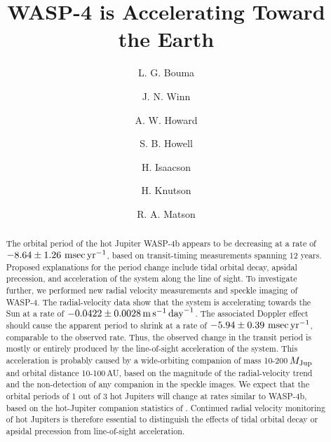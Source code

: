 \documentclass[12pt,twocolumn,tighten]{aastex62}
\begin{document}

\title{WASP-4 is Accelerating Toward the Earth}


%
%
\author[0000-0002-0514-5538]{L. G. Bouma}
%
\author[0000-0002-4265-047X]{J. N. Winn}

%
%
\author[0000-0001-8638-0320]{A. W. Howard}
%
\author[0000-0002-2532-2853]{S. B. Howell}
%
\author[0000-0002-0531-1073]{H. Isaacson}
%
\author{H. Knutson}
%
\author[0000-0001-7233-7508]{R. A. Matson}
%

\begin{abstract}
  The orbital period of the hot Jupiter WASP-4b appears to be
  decreasing at a rate of $-8.64 \pm 1.26~{\rm msec}\,{\rm yr}^{-1}$,
  based on transit-timing measurements spanning 12 years.  Proposed
  explanations for the period change include tidal orbital decay,
  apsidal precession, and acceleration of the system along the line of
  sight.  To investigate further, we performed new radial velocity
  measurements and speckle imaging of WASP-4.  The radial-velocity
  data show that the system is accelerating towards the Sun at a rate
  of $-0.0422\pm 0.0028\,{\rm m}\,{\rm s}^{-1}\,{\rm day}^{-1}$.  The
  associated Doppler effect should cause the apparent period to shrink
  at a rate of $-5.94 \pm 0.39~{\rm msec}\,{\rm yr}^{-1}$, comparable
  to the observed rate.  Thus, the observed change in the transit
  period is mostly or entirely produced by the line-of-sight
  acceleration of the system.  This acceleration is probably caused by
  a wide-orbiting companion of mass 10-200$\,M_{\rm Jup}$ and orbital
  distance 10-100$\,$AU, based on the magnitude of the radial-velocity
  trend and the non-detection of any companion in the speckle images.
  We expect that the orbital periods of 1 out of 3 hot Jupiters will
  change at rates similar to WASP-4b, based on the hot-Jupiter
  companion statistics of \citet{knutson_friends_2014}.
  Continued radial velocity monitoring of hot Jupiters is therefore
  essential to distinguish the effects of tidal orbital decay or
  apsidal precession from line-of-sight acceleration.
\end{abstract}
\end{document}

